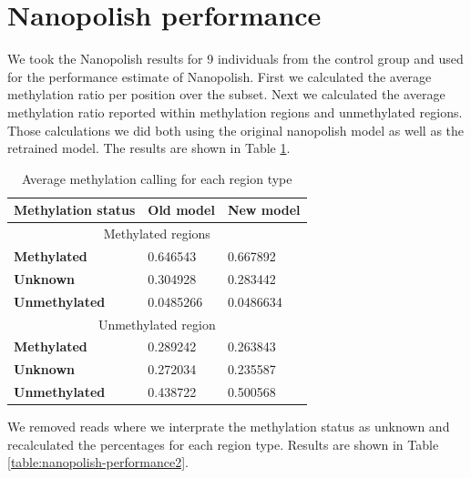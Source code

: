 \section{Nanopolish performance}
\label{section:results:Nanopolish-performance}
We took the Nanopolish results for 9 individuals from the control group and used for the performance estimate of Nanopolish. First we calculated the average methylation ratio per position over the subset. Next we calculated the average methylation ratio reported within methylation regions and unmethylated regions. Those calculations we did both using the original nanopolish model as well as the retrained model. The results are shown in Table \ref{table:nanopolish-performance1}.

\begin {table}
    \caption{Average methylation calling for each region type}
    \begin{center}
        \begin{tabular}{l l l } 
            \hline
             \textbf{Methylation status} & \textbf{Old model} & \textbf{New model}\\
             \hline
             \hline
              \multicolumn{3}{c}{Methylated regions} \\
             \hline
             \textbf{Methylated} & 0.646543 & 0.667892 \\ 
             \textbf{Unknown} & 0.304928 & 0.283442\\
             \textbf{Unmethylated} & 0.0485266 & 0.0486634\\ 
             \hline
            \multicolumn{3}{c}{Unmethylated region} \\
            \hline
             \textbf{Methylated} & 0.289242 & 0.263843 \\ 
             \textbf{Unknown} & 0.272034 & 0.235587\\
             \textbf{Unmethylated} & 0.438722 & 0.500568\\ 
             \hline
        \end{tabular}
    \label{table:nanopolish-performance1}
    \end{center}
\end{table}

We removed reads where we interprate the methylation status as unknown and recalculated the percentages for each region type. Results are shown in Table \ref{table:nanopolish-performance2}.

